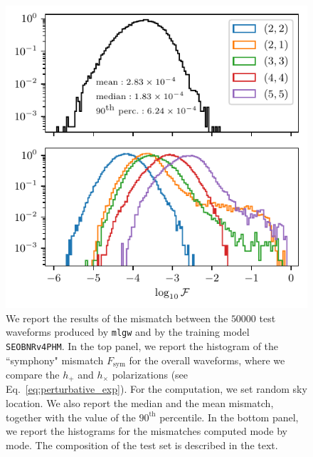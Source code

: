 \documentclass[twocolumn,showpacs,preprintnumbers,nofootinbib,prd,
superscriptaddress,10pt]{revtex4-1}
\begin{document}
\begin{figure}[t]
	\centering
	\includegraphics[scale = 1]{accuracy}
	\caption{We report the results of the mismatch between the $50000$ test waveforms produced by \texttt{mlgw} and by the training model \texttt{SEOBNRv4PHM}.
	In the top panel, we report the histogram of the ``symphony" mismatch $F_\text{sym}$ for the overall waveforms, where we compare the $h_+$ and $h_\times$ polarizations (see Eq.~\eqref{eq:perturbative_exp}). For the computation, we set random sky location. We also report the median and the mean mismatch, together with the value of the $90^\text{th}$ percentile.
	In the bottom panel, we report the histograms for the mismatches computed mode by mode.
	The composition of the test set is described in the text.
	}
	\label{fig:accuracy_hist}
\end{figure}
\end{document}
